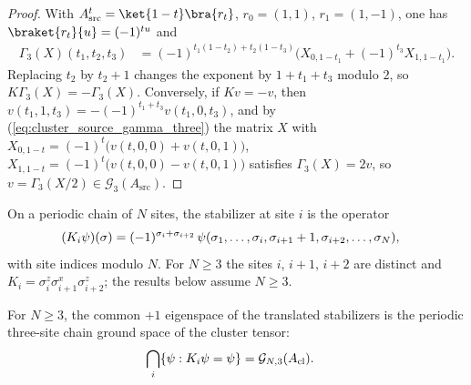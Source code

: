 \begin{proof}
    \leanok
    With $A_{\mathrm{src}}^t = \ket{1-t}\bra{r_t}$, $r_0 = (1,1)$,
    $r_1 = (1,-1)$, one has $\braket{r_t}{u} = (-1)^{tu}$ and
    \begin{align}
        \Gamma_3(X)(t_1,t_2,t_3)
         & = (-1)^{t_1(1-t_2)+t_2(1-t_3)}
        \bigl(X_{0,1-t_1} + (-1)^{t_3}X_{1,1-t_1}\bigr).
        \label{eq:cluster_source_gamma_three}
    \end{align}
    Replacing $t_2$ by $t_2+1$ changes the exponent by $1+t_1+t_3$ modulo
    $2$, so $K\Gamma_3(X) = -\Gamma_3(X)$. Conversely, if $Kv = -v$, then
    $v(t_1,1,t_3) = -(-1)^{t_1+t_3}v(t_1,0,t_3)$, and by
    (\ref{eq:cluster_source_gamma_three}) the matrix $X$ with
    $X_{0,1-t} = (-1)^t\bigl(v(t,0,0)+v(t,0,1)\bigr)$,
    $X_{1,1-t} = (-1)^t\bigl(v(t,0,0)-v(t,0,1)\bigr)$ satisfies
    $\Gamma_3(X) = 2v$, so $v = \Gamma_3(X/2)\in\mathcal G_3(A_{\mathrm{src}})$.
\end{proof}

\begin{definition}\label{def:cluster_chain_stabilizer}
    \leanok
    On a periodic chain of $N$ sites, the stabilizer at site $i$ is the
    operator
    \begin{align}
        (K_i\psi)(\sigma)
         & = (-1)^{\sigma_i+\sigma_{i+2}}\,
        \psi(\sigma_1,\ldots,\sigma_i,\sigma_{i+1}+1,\sigma_{i+2},\ldots,\sigma_N),
        \notag
    \end{align}
    with site indices modulo $N$. For $N\ge3$ the sites $i$, $i+1$, $i+2$
    are distinct and $K_i = \sigma^z_i\sigma^x_{i+1}\sigma^z_{i+2}$; the
    results below assume $N\ge3$.
\end{definition}

\begin{lemma}
    \label{thm:cluster_stabilizer_chain_ground_space}
    \leanok
    For $N\ge3$, the common $+1$ eigenspace of the translated stabilizers is
    the periodic three-site chain ground space of the cluster tensor:
    \begin{align}
        \bigcap_i\{\psi : K_i\psi = \psi\}
         & = \mathcal G_{N,3}(A_{\mathrm{cl}}).
        \notag
    \end{align}
\end{lemma}

